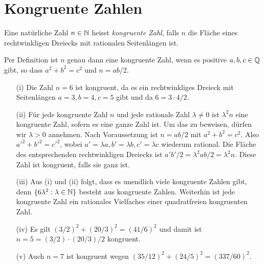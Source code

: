 \chapter{Kongruente Zahlen}

\begin{definition}
  Eine natürliche Zahl $n\in{\mathbb{N}}$ heisst \emph{kongruente
    Zahl}, falls
  $n$ die Fläche eines rechtwinkligen Dreiecks mit rationalen
  Seitenlängen ist. 
\end{definition}

\begin{bemerkung}
  Per Definition ist $n$ genau dann eine kongruente Zahl, wenn es positive
  $a,b,c\in{\mathbb{Q}}$ gibt, so dass $a^2+b^2=c^2$ und $n = ab/2$. 
\end{bemerkung}

\begin{beispiele}\leavevmode
  \begin{enumerate}
  \item [(i)]
    Die Zahl $n=6$ ist kongruent, da es ein rechtwinkliges Dreieck mit Seitenlängen
    $a=3,b=4,c=5$  gibt und da $6=3\cdot 4/2$. 
  \item[(ii)]
    Für jede kongruente Zahl $n$ und jede rationale Zahl
    $\lambda\not=0$ ist $\lambda^2 n$ eine kongruente Zahl, sofern es
    eine ganze Zahl ist. Um das zu
    beweisen, dürfen wir $\lambda > 0$ annehmen. Nach Voraussetzung
    ist $n=ab/2$ mit $a^2+b^2=c^2$. Also ${a'}^2+{b'}^2={c'}^2$, wobei
    $a'=\lambda a, b'=\lambda b, c'=\lambda c$ wiederum rational.
    Die Fläche des entsprechenden rechtwinkligen Dreiecks ist
     $a'b'/2
    = \lambda^2 ab/2 = \lambda^2 n$. Diese Zahl ist kongruent, falls sie ganz ist.
  \item[(iii)]
    Aus (i) und (ii) folgt, dass es unendlich viele kongruente Zahlen
    gibt, denn $\{6\lambda^2 : \lambda\in{\mathbb{N}}\}$ besteht aus kongruente
    Zahlen.
    Weiterhin ist jede kongruente Zahl ein rationales Vielfaches
    einer quadratfreien kongruenten Zahl.

  \item[(iv)] Es gilt $(3/2)^2 +(20/3)^2 = (41/6)^2$  und damit ist
    $n=5= (3/2)\cdot(20/3)/2$ kongruent.
    
  \item[(v)] Auch $n=7$ ist kongruent wegen $(35/12)^2 +
    (24/5)^2=(337/60)^2$.

  \end{enumerate}  
\end{beispiele}

